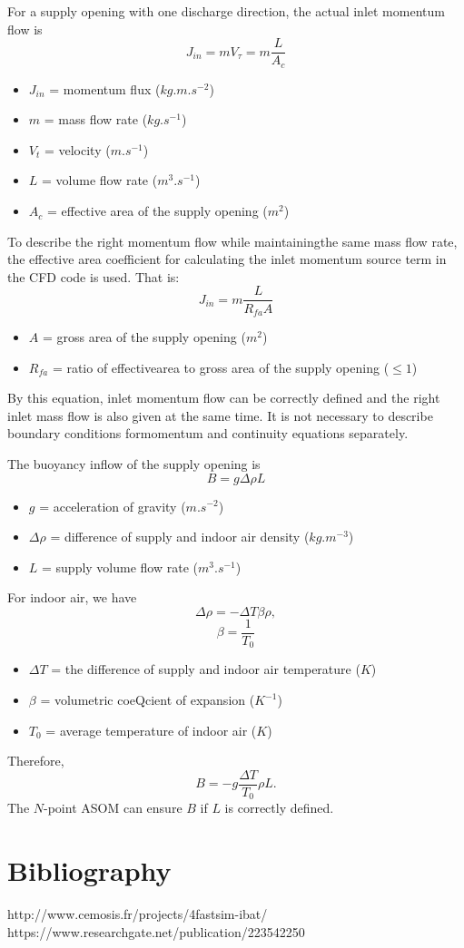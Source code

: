\documentclass[a4paper,10pt]{article}
\begin{document}
For a supply opening with one discharge direction, the actual inlet momentum flow is
$$J_{in} = mV_{\tau} = m\frac{L}{A_c}$$
\begin{itemize}
    \item $J_{in}$ = momentum flux ($kg.m.s^{-2}$)
    \item $m$ = mass flow rate ($kg.s^{-1}$)
    \item $V_t$ = velocity ($m.s^{-1}$)
    \item $L$ = volume flow rate ($m^3.s^{-1}$)
    \item $A_c$ = effective area of the supply opening ($m^2$)
\end{itemize}
To describe the right momentum flow while maintainingthe same mass flow rate, the effective area coefficient for calculating the inlet momentum source term in the CFD code is used. That is:
$$J_{in} = m\frac{L}{R_{fa}A}$$
\begin{itemize}
    \item $A$ = gross area of the supply opening ($m^2$)
    \item $R_{fa}$ = ratio of effectivearea to gross area of the supply opening ($\leqslant 1$)
\end{itemize}
By this equation, inlet momentum flow can be correctly defined and the right inlet mass flow is also given at the same time. It is not necessary to describe boundary conditions formomentum and continuity equations separately. 

The buoyancy inflow of the supply opening is
$$B = g\Delta\rho L$$
\begin{itemize}
    \item $g$ = acceleration of gravity ($m.s^{-2}$)
    \item $\Delta\rho$ = difference of supply and indoor air density ($kg.m^{-3}$)
    \item $L$ = supply volume flow rate ($m^3.s^{-1}$)
\end{itemize}

For indoor air, we have
$$\Delta\rho = -\Delta T\beta\rho,$$
$$\beta = \frac{1}{T_0}$$
\begin{itemize}
    \item $\Delta T$ = the difference of supply and indoor air temperature ($K$)
    \item $\beta$ = volumetric coeQcient of expansion ($K^{-1}$)
    \item $T_0$ = average temperature of indoor air ($K$)
\end{itemize}
Therefore,
$$B=−g\frac{\Delta T}{T_0}\rho L.$$
The $N$-point ASOM can ensure $B$ if $L$ is correctly defined.

\section*{Bibliography}
http://www.cemosis.fr/projects/4fastsim-ibat/\\
https://www.researchgate.net/publication/223542250
\end{document}
